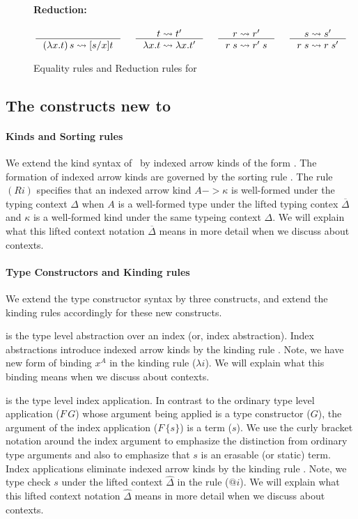 \begin{figure}
\begin{framed}
\paragraph{Reduction:}
\[ \inference{}{(\lambda x.t)\,s \rightsquigarrow [s/x]t}
 ~~~~
   \inference{t \rightsquigarrow t'}{\lambda x.t \rightsquigarrow \lambda x.t'}
 ~~~~
   \inference{r \rightsquigarrow r'}{r\;s \rightsquigarrow r'\;s}
 ~~~~
   \inference{s \rightsquigarrow s'}{r\;s \rightsquigarrow r\;s'}
\]
\end{framed}
\caption{Equality rules and Reduction rules for \Fi}
\label{fig:eqFi}
\end{figure}

\subsection{The constructs new to \Fi}
\paragraph{Kinds and Sorting rules}
We extend the kind syntax of \Fw\ by indexed arrow kinds of the form
. The formation of indexed arrow kinds are
governed by the sorting rule .
The rule $(Ri)$ specifies that an indexed arrow kind $A -> \kappa$
is well-formed under the typing context $\Delta$
when $A$ is a well-formed type under the lifted typing contex $\overline\Delta$
and $\kappa$ is a well-formed kind under the same typeing context $\Delta$.
We will explain what this lifted context notation $\overline\Delta$ means
in more detail when we discuss about contexts.

\paragraph{Type Constructors and Kinding rules}
We extend the type constructor syntax by three constructs,
and extend the kinding rules accordingly for these new constructs.

 is the type level abstraction over an index
(or, index abstraction). Index abstractions introduce indexed arrow kinds
by the kinding rule . Note, we have new form of binding
$x^A$ in the kinding rule ($\lambda i$).
We will explain what this binding means when we discuss about contexts.

 is the type level index application. In contrast to
the ordinary type level application ($F\,G$) whose argument being applied is
a type constructor ($G$), the argument of the index application ($F\,\{s\}$) is
a term ($s$). We use the curly bracket notation around the index argument to
emphasize the distinction from ordinary type arguments and also to emphasize
that $s$ is an erasable (or static) term. Index applications eliminate
indexed arrow kinds by the kinding rule . Note, we type check $s$
under the lifted context $\hat\Delta$ in the rule ($@i$).
We will explain what this lifted context notation $\hat\Delta$ means
in more detail when we discuss about contexts.

